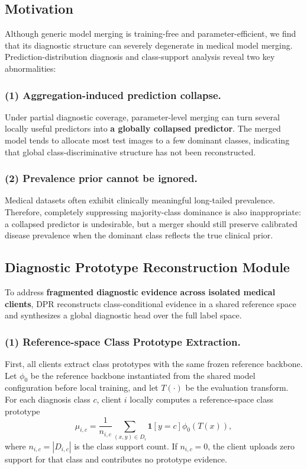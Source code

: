 \documentclass[letterpaper]{article} %
\begin{document}
\subsection{Motivation}

Although generic model merging is training-free and parameter-efficient, we find that its diagnostic structure can severely degenerate in medical model merging. Prediction-distribution diagnosis and class-support analysis reveal two key abnormalities:

\subsubsection{(1) Aggregation-induced prediction collapse.} Under partial diagnostic coverage, parameter-level merging can turn several locally useful predictors into \textbf{a globally collapsed predictor}. The merged model tends to allocate most test images to a few dominant classes, indicating that global class-discriminative structure has not been reconstructed.

\subsubsection{(2) Prevalence prior cannot be ignored.} Medical datasets often exhibit clinically meaningful long-tailed prevalence. Therefore, completely suppressing majority-class dominance is also inappropriate: a collapsed predictor is undesirable, but a merger should still preserve calibrated disease prevalence when the dominant class reflects the true clinical prior.

\subsection{Diagnostic Prototype Reconstruction Module}

To address \textbf{fragmented diagnostic evidence across isolated medical clients}, DPR reconstructs class-conditional evidence in a shared reference space and synthesizes a global diagnostic head over the full label space.

\subsubsection{(1) Reference-space Class Prototype Extraction.}


First, all clients extract class prototypes with the same frozen reference backbone. Let $\phi_0$ be the reference backbone instantiated from the shared model configuration before local training, and let $T(\cdot)$ be the evaluation transform. For each diagnosis class $c$, client $i$ locally computes a reference-space class prototype
\begin{equation}
\mu_{i,c}=\frac{1}{n_{i,c}}\sum_{(x,y)\in D_i}\mathbf{1}[y=c]\phi_0(T(x)),
\end{equation}
where $n_{i,c}=|D_{i,c}|$ is the class support count. If $n_{i,c}=0$, the client uploads zero support for that class and contributes no prototype evidence.
\end{document}

